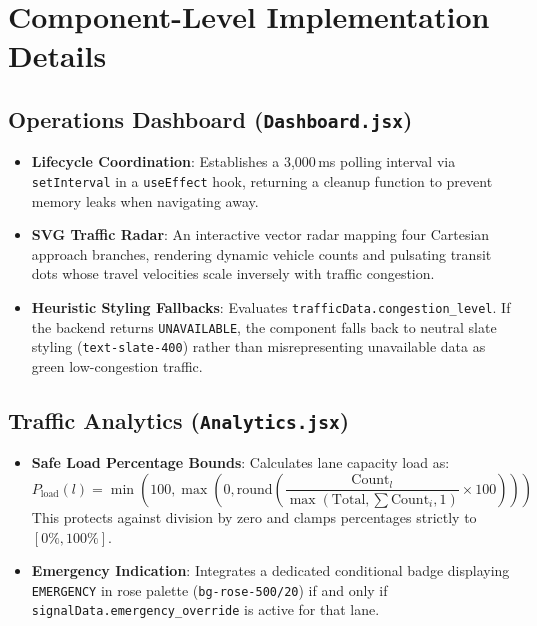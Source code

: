 \documentclass[11pt,a4paper,oneside]{report}
\begin{document}
\section{Component-Level Implementation Details}

\subsection{Operations Dashboard (\texttt{Dashboard.jsx})}
\begin{itemize}[leftmargin=*]
    \item \textbf{Lifecycle Coordination}: Establishes a 3,000\,ms polling interval via \texttt{setInterval} in a \texttt{useEffect} hook, returning a cleanup function to prevent memory leaks when navigating away.
    \item \textbf{SVG Traffic Radar}: An interactive vector radar mapping four Cartesian approach branches, rendering dynamic vehicle counts and pulsating transit dots whose travel velocities scale inversely with traffic congestion.
    \item \textbf{Heuristic Styling Fallbacks}: Evaluates \texttt{trafficData.congestion\_level}. If the backend returns \texttt{UNAVAILABLE}, the component falls back to neutral slate styling (\texttt{text-slate-400}) rather than misrepresenting unavailable data as green low-congestion traffic.
\end{itemize}

\subsection{Traffic Analytics (\texttt{Analytics.jsx})}
\begin{itemize}[leftmargin=*]
    \item \textbf{Safe Load Percentage Bounds}: Calculates lane capacity load as:
    \begin{equation}
    P_{\text{load}}(l) = \min\left(100, \max\left(0, \text{round}\left(\frac{\text{Count}_l}{\max(\text{Total}, \sum \text{Count}_i, 1)} \times 100\right)\right)\right)
    \end{equation}
    This protects against division by zero and clamps percentages strictly to $[0\%, 100\%]$.
    \item \textbf{Emergency Indication}: Integrates a dedicated conditional badge displaying \texttt{EMERGENCY} in rose palette (\texttt{bg-rose-500/20}) if and only if \texttt{signalData.emergency\_override} is active for that lane.
\end{itemize}
\end{document}
